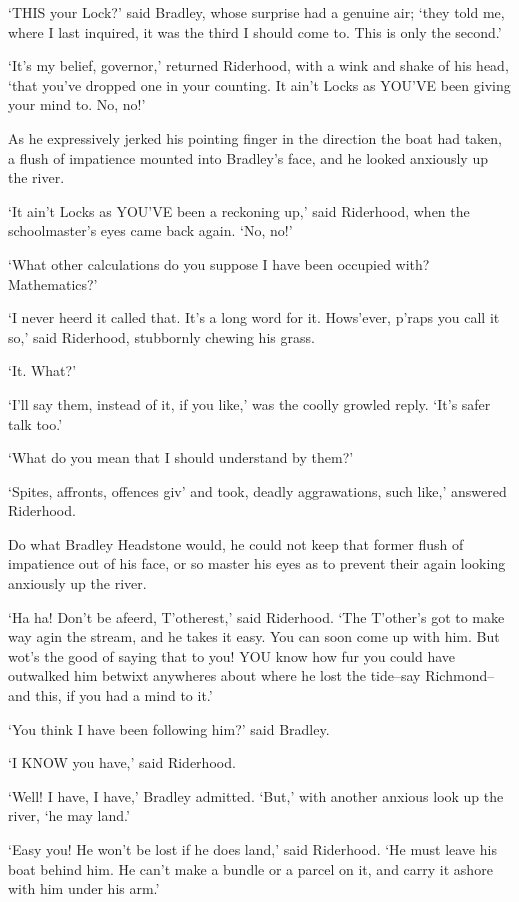 ‘THIS your Lock?’ said Bradley, whose surprise had a genuine air; ‘they
told me, where I last inquired, it was the third I should come to. This
is only the second.’

‘It’s my belief, governor,’ returned Riderhood, with a wink and shake of
his head, ‘that you’ve dropped one in your counting. It ain’t Locks as
YOU’VE been giving your mind to. No, no!’

As he expressively jerked his pointing finger in the direction the boat
had taken, a flush of impatience mounted into Bradley’s face, and he
looked anxiously up the river.

‘It ain’t Locks as YOU’VE been a reckoning up,’ said Riderhood, when the
schoolmaster’s eyes came back again. ‘No, no!’

‘What other calculations do you suppose I have been occupied with?
Mathematics?’

‘I never heerd it called that. It’s a long word for it. Hows’ever,
p’raps you call it so,’ said Riderhood, stubbornly chewing his grass.

‘It. What?’

‘I’ll say them, instead of it, if you like,’ was the coolly growled
reply. ‘It’s safer talk too.’

‘What do you mean that I should understand by them?’

‘Spites, affronts, offences giv’ and took, deadly aggrawations, such
like,’ answered Riderhood.

Do what Bradley Headstone would, he could not keep that former flush of
impatience out of his face, or so master his eyes as to prevent their
again looking anxiously up the river.

‘Ha ha! Don’t be afeerd, T’otherest,’ said Riderhood. ‘The T’other’s got
to make way agin the stream, and he takes it easy. You can soon come up
with him. But wot’s the good of saying that to you! YOU know how fur
you could have outwalked him betwixt anywheres about where he lost the
tide--say Richmond--and this, if you had a mind to it.’

‘You think I have been following him?’ said Bradley.

‘I KNOW you have,’ said Riderhood.

‘Well! I have, I have,’ Bradley admitted. ‘But,’ with another anxious
look up the river, ‘he may land.’

‘Easy you! He won’t be lost if he does land,’ said Riderhood. ‘He must
leave his boat behind him. He can’t make a bundle or a parcel on it, and
carry it ashore with him under his arm.’

